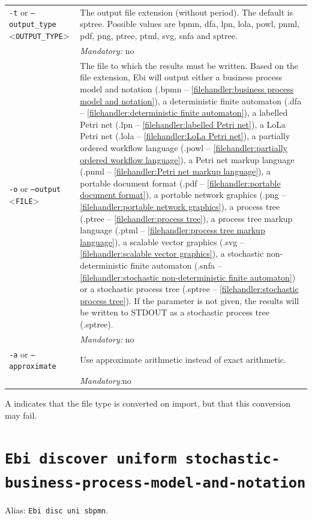 {\begin{tabularx}{\linewidth}{lX}
\texttt{-t} or \texttt{--output\_type} <\texttt{OUTPUT\_TYPE}> &
The output file extension (without period). The default is sptree. Possible values are bpmn, dfa, lpn, lola, powl, pnml, pdf, png, ptree, ptml, svg, snfa and sptree.\\
&\textit{Mandatory:} \quad no\\
\texttt{-o} or \texttt{--output} <\texttt{FILE}> &
The file to which the results must be written. Based on the file extension, Ebi will output either a business process model and notation (.bpmn -- \cref{filehandler:business process model and notation}), a deterministic finite automaton (.dfa -- \cref{filehandler:deterministic finite automaton}), a labelled Petri net (.lpn -- \cref{filehandler:labelled Petri net}), a LoLa Petri net (.lola -- \cref{filehandler:LoLa Petri net}), a partially ordered workflow language (.powl -- \cref{filehandler:partially ordered workflow language}), a Petri net markup language (.pnml -- \cref{filehandler:Petri net markup language}), a portable document format (.pdf -- \cref{filehandler:portable document format}), a portable network graphics (.png -- \cref{filehandler:portable network graphics}), a process tree (.ptree -- \cref{filehandler:process tree}), a process tree markup language (.ptml -- \cref{filehandler:process tree markup language}), a scalable vector graphics (.svg -- \cref{filehandler:scalable vector graphics}), a stochastic non-deterministic finite automaton (.snfa -- \cref{filehandler:stochastic non-deterministic finite automaton}) or a stochastic process tree (.sptree -- \cref{filehandler:stochastic process tree}).
If the parameter is not given, the results will be written to STDOUT as a stochastic process tree (.sptree).\\
&\textit{Mandatory:} \quad no\\
\texttt{-a} or \texttt{--approximate} & Use approximate arithmetic instead of exact arithmetic.\\
&\textit{Mandatory:}\quad no\\
\bottomrule
\end{tabularx}
A \textdagger{} indicates that the file type is converted on import, but that this conversion may fail.
\clearpage\section{\texttt{Ebi discover uniform stochastic-business-process-model-and-notation}}
\label{command:Ebi discover uniform stochastic-business-process-model-and-notation}
Alias: \texttt{Ebi disc uni sbpmn}.\\
}
